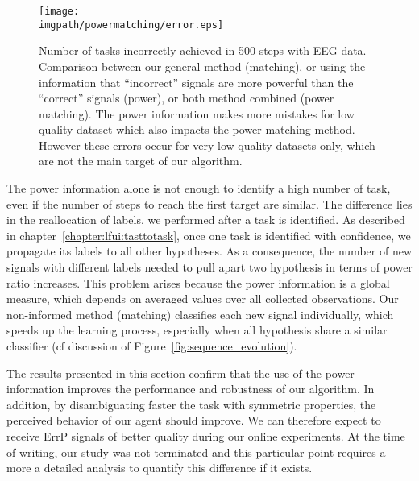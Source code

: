 \begin{figure}[!htbp]
\centering
\texttt{[image: \\imgpath/powermatching/error.eps]}
\caption{Number of tasks incorrectly achieved in 500 steps with EEG data. Comparison between our general method (matching), or using the information that ``incorrect'' signals are more powerful than the ``correct'' signals (power), or both method combined (power matching). The power information makes more mistakes for low quality dataset which also impacts the power matching method. However these errors occur for very low quality datasets only, which are not the main target of our algorithm.}
\label{fig:nWrongEEG_powermatching}
\end{figure} 

The power information alone is not enough to identify a high number of task, even if the number of steps to reach the first target are similar. The difference lies in the reallocation of labels, we performed after a task is identified. As described in chapter~\ref{chapter:lfui:tasttotask}, once one task is identified with confidence, we propagate its labels to all other hypotheses. As a consequence, the number of new signals with different labels needed to pull apart two hypothesis in terms of power ratio increases. This problem arises because the power information is a global measure, which depends on averaged values over all collected observations. Our non-informed method (matching) classifies each new signal individually, which speeds up the learning process, especially when all hypothesis share a similar classifier (cf discussion of Figure~\ref{fig:sequence_evolution}).

The results presented in this section confirm that the use of the power information improves the performance and robustness of our algorithm. In addition, by disambiguating faster the task with symmetric properties, the perceived behavior of our agent should improve. We can therefore expect to receive ErrP signals of better quality during our online experiments. At the time of writing, our study was not terminated and this particular point requires a more a detailed analysis to quantify this difference if it exists.



